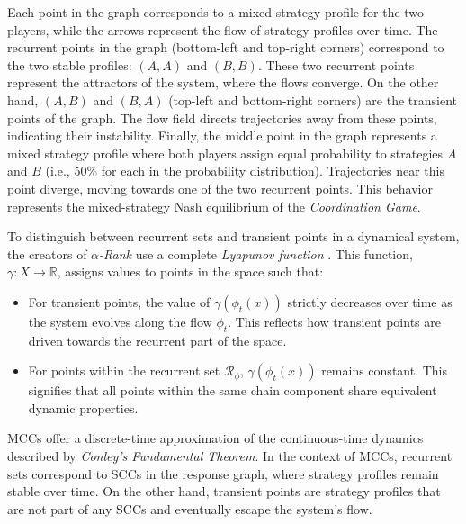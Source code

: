         \noindent
        Each point in the graph corresponds to a mixed strategy profile for the two players, while the arrows represent the flow of strategy profiles over time. The recurrent points in the graph (bottom-left and top-right corners) correspond to the two stable profiles: $(A,A)$ and $(B,B)$. These two recurrent points represent the attractors of the system, where the flows converge. On the other hand, $(A,B)$ and $(B,A)$ (top-left and bottom-right corners) are the transient points of the graph. The flow field directs trajectories away from these points, indicating their instability. Finally, the middle point in the graph represents a mixed strategy profile where both players assign equal probability to strategies $A$ and $B$ (i.e., 50\% for each in the probability distribution). Trajectories near this point diverge, moving towards one of the two recurrent points. This behavior represents the mixed-strategy Nash equilibrium of the \emph{Coordination Game}.\tinydouble

        \noindent
        To distinguish between recurrent sets and transient points in a dynamical system, the creators of \emph{$\alpha$-Rank} use a complete \emph{Lyapunov function} \cite{lyapunov1950}. This function, $\gamma: X \to \mathbb{R}$, assigns values to points in the space such that:
        \begin{itemize}
            \item For transient points, the value of $\gamma(\phi_t(x))$ strictly decreases over time as the system evolves along the flow $\phi_t$. This reflects how transient points are driven towards the recurrent part of the space.
            \item For points within the recurrent set $\mathcal{R}_\phi$, $\gamma(\phi_t(x))$ remains constant. This signifies that all points within the same chain component share equivalent dynamic properties.
        \end{itemize}

        \noindent
        MCCs offer a discrete-time approximation of the continuous-time dynamics described by \emph{Conley’s Fundamental Theorem}. In the context of MCCs, recurrent sets correspond to SCCs in the response graph, where strategy profiles remain stable over time. On the other hand, transient points are strategy profiles that are not part of any SCCs and eventually escape the system's flow.\tinydouble
        
